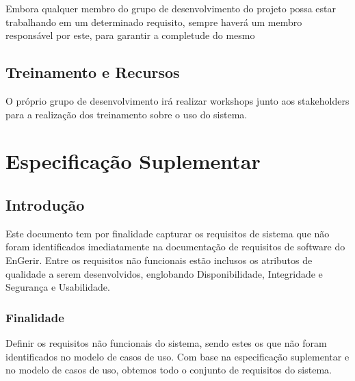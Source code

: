 Embora qualquer membro do grupo de desenvolvimento do projeto possa estar trabalhando em um determinado requisito, sempre haverá um membro responsável por este, para garantir a completude do mesmo

\section{Treinamento e Recursos}

O próprio grupo de desenvolvimento irá realizar workshops junto aos stakeholders para a realização dos treinamento sobre o uso do sistema.





































\chapter{Especificação Suplementar}
\label{especificação_suplementar}

\section{Introdução}

Este documento tem por finalidade capturar os requisitos de sistema que não foram identificados imediatamente na documentação de requisitos de software do EnGerir. Entre os requisitos não funcionais estão inclusos os atributos de qualidade a serem desenvolvidos, englobando Disponibilidade, Integridade e Segurança e Usabilidade.

\subsection{Finalidade}

Definir os requisitos não funcionais do sistema, sendo estes os que não foram identificados no modelo de casos de uso. Com base na especificação suplementar e no modelo de casos de uso, obtemos todo o conjunto de requisitos do sistema.

